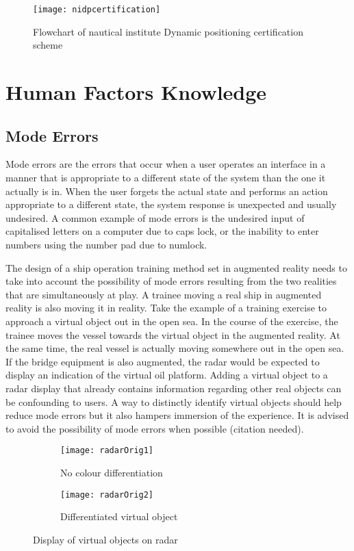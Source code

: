 \begin{figure}
	\centering
	\texttt{[image: nidpcertification]}
	\caption{Flowchart of nautical institute Dynamic positioning certification scheme}
	\label{fig:nidpcertification}
\end{figure} 

\section{Human Factors Knowledge}
\label{sec:humanfactors}
\subsection{Mode Errors}
Mode errors are the errors that occur when a user operates an interface in a manner that is appropriate to a different state of the system than the one it actually is in. When the user forgets the actual state and performs an action appropriate to a different state, the system response is unexpected and usually undesired. A common example of mode errors is the undesired input of capitalised letters on a computer due to caps lock, or the inability to enter numbers using the number pad due to numlock. 

The design of a ship operation training method set in augmented reality needs to take into account the possibility of mode errors resulting from the two realities that are simultaneously at play. A trainee moving a real ship in augmented reality is also moving it in reality. Take the example of a training exercise to approach a virtual object out in the open sea. In the course of the exercise, the trainee moves the vessel towards the virtual object in the augmented reality. At the same time, the real vessel is actually moving somewhere out in the open sea. If the bridge equipment is also augmented, the radar would be expected to display an indication of the virtual oil platform. Adding a virtual object to a radar display that already contains information regarding other real objects can be confounding to users. A way to distinctly identify virtual objects should help reduce mode errors but it also hampers immersion of the experience. 
It is advised to avoid the possibility of mode errors when possible (citation needed). 

\begin{figure}[ht]
    \centering
    \begin{subfigure}[b]{0.45\textwidth}
        \centering
        \texttt{[image: radarOrig1]}
        \caption{No colour differentiation}
        \label{fig:three sin x}
    \end{subfigure}
    \hfill
    \begin{subfigure}[b]{0.45\textwidth}
        \centering
        \texttt{[image: radarOrig2]}
        \caption{Differentiated virtual object}
        \label{fig:five over x}
    \end{subfigure}
    \caption{Display of virtual objects on radar}
    \label{fig:three graphs}
\end{figure}

